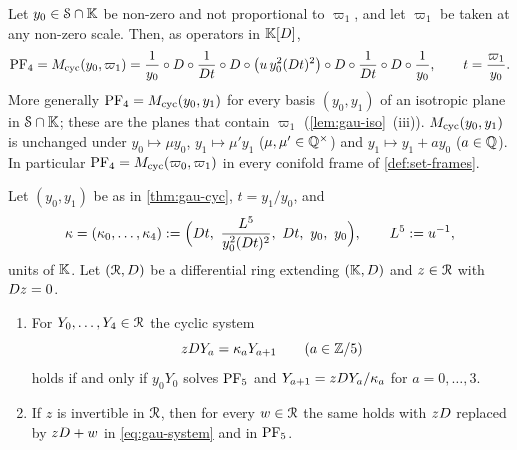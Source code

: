 \begin{thm}
\label{thm:gau-cyc}
Let $y_0\in\mathcal S\cap\mathbb{K}$ be non-zero and not proportional to $\varpi_1$, and let $\varpi_1$ be taken at any non-zero scale. Then, as operators in $\mathbb{K}[D]$,
\begin{equation}
\label{eq:gau-cyc}
\mathrm{PF}_{4}=M_{\mathrm{cyc}}(y_0,\varpi_1)=\frac1{y_0}\circ D\circ\frac1{D t}\circ D\circ\bigl(u\,y_0^2(D t)^2\bigr)\circ D\circ\frac1{D t}\circ D\circ\frac1{y_0},\qquad t=\frac{\varpi_1}{y_0}.
\end{equation}
More generally $\mathrm{PF}_{4}=M_{\mathrm{cyc}}(y_0,y_1)$ for every basis $(y_0,y_1)$ of an isotropic plane in $\mathcal S\cap\mathbb{K}$; these are the planes that contain $\varpi_1$ (\cref{lem:gau-iso}~(iii)). $M_{\mathrm{cyc}}(y_0,y_1)$ is unchanged under $y_0\mapsto\mu y_0$, $y_1\mapsto\mu'y_1$ ($\mu,\mu'\in\mathbb{Q}^\times$) and $y_1\mapsto y_1+ay_0$ ($a\in\mathbb{Q}$). In particular $\mathrm{PF}_{4}=M_{\mathrm{cyc}}(\varpi_0,\varpi_1)$ in every conifold frame of \cref{def:set-frames}.
\end{thm}

\begin{cor}
\label{cor:gau-cycsys}
Let $(y_0,y_1)$ be as in \cref{thm:gau-cyc}, $t=y_1/y_0$, and
\[
\kappa=(\kappa_0,\dots,\kappa_4):=\Bigl(\Dq t,\ \frac{L^5}{y_0^2(\Dq t)^2},\ \Dq t,\ y_0,\ y_0\Bigr),\qquad L^5:=u^{-1},
\]
units of $\mathbb{K}$. Let $(\mathcal{R},D)$ be a differential ring extending $(\mathbb{K},D)$ and $z\in\mathcal{R}$ with $D z=0$.
\begin{enumerate}
\item For $Y_0,\dots,Y_4\in\mathcal{R}$ the cyclic system
\begin{equation}
\label{eq:gau-system}
zD Y_a=\kappa_aY_{a+1}\qquad(a\in\mathbb{Z}/5)
\end{equation}
holds if and only if $y_0Y_0$ solves $\mathrm{PF}_{5}$ and $Y_{a+1}=zD Y_a/\kappa_a$ for $a=0,\dots,3$.
\item If $z$ is invertible in $\mathcal{R}$, then for every $w\in\mathcal{R}$ the same holds with $zD$ replaced by $zD+w$ in \eqref{eq:gau-system} and in $\mathrm{PF}_{5}$.
\end{enumerate}
\end{cor}


